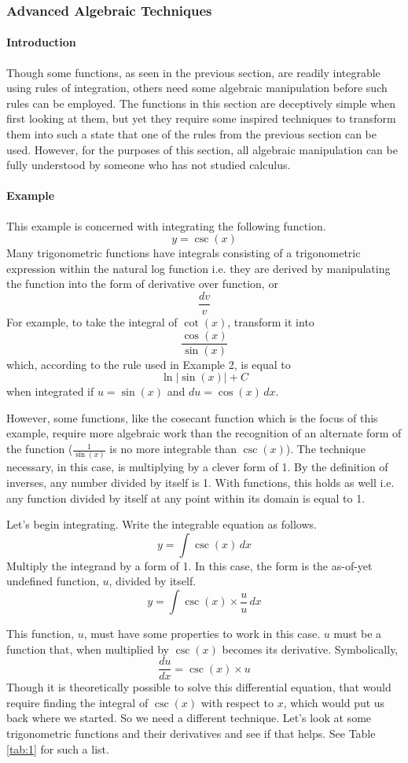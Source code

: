 \documentclass{article}
\newcounter{example}%
\newcommand{\ex}{\stepcounter{example} \paragraph{Example \theexample}}
\begin{document}
\subsubsection{Advanced Algebraic Techniques}
\paragraph{Introduction} Though some functions, as seen in the previous section, are readily integrable using rules of integration, others need some algebraic manipulation before such rules can be employed. The functions in this section are deceptively simple when first looking at them, but yet they require some inspired techniques to transform them into such a state that one of the rules from the previous section can be used. However, for the purposes of this section, all algebraic manipulation can be fully understood by someone who has not studied calculus.
\ex This example is concerned with integrating the following function.$$y=\csc(x)$$Many trigonometric functions have integrals consisting of a trigonometric expression within the natural log function i.e. they are derived by manipulating the function into the form of derivative over function, or$$\frac{dv}{v}$$For example, to take the integral of $\cot(x)$, transform it into$$\frac{\cos(x)}{\sin(x)}$$which, according to the rule used in Example 2, is equal to$$\ln|\sin(x)|+C$$when integrated if $u=\sin(x)$ and $du=\cos(x)\, dx$.\par
However, some functions, like the cosecant function which is the focus of this example, require more algebraic work than the recognition of an alternate form of the function ($\frac{1}{\sin(x)}$ is no more integrable than $\csc(x)$). The technique necessary, in this case, is multiplying by a clever form of 1. By the definition of inverses, any number divided by itself is 1. With functions, this holds as well i.e. any function divided by itself at any point within its domain is equal to 1.\par
Let's begin integrating. Write the integrable equation as follows.
\begin{equation*}
    y=\int \csc(x)\, dx
\end{equation*}
Multiply the integrand by a form of 1. In this case, the form is the as-of-yet undefined function, $u$, divided by itself.
\begin{equation}
    y=\int \csc(x)\times\frac{u}{u}\, dx
\end{equation}\par
This function, $u$, must have some properties to work in this case. $u$ must be a function that, when multiplied by $\csc(x)$ becomes its derivative. Symbolically,$$\frac{du}{dx}=\csc(x)\times u$$Though it is theoretically possible to solve this differential equation, that would require finding the integral of $\csc(x)$ with respect to $x$, which would put us back where we started. So we need a different technique. Let's look at some trigonometric functions and their derivatives and see if that helps. See Table \ref{tab:1} for such a list.
\end{document}
